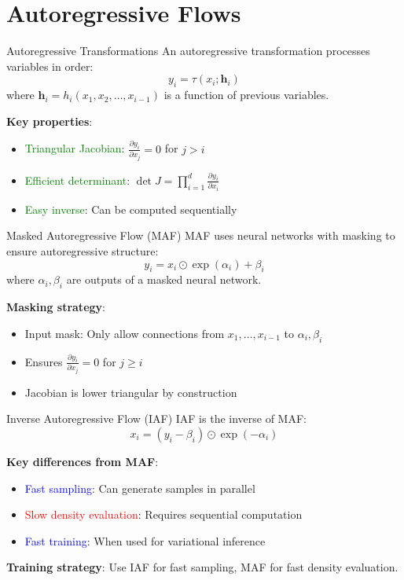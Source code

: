 \documentclass[aspectratio=169]{beamer}
\begin{document}
\section{Autoregressive Flows}

\begin{frame}{Autoregressive Transformations}
An autoregressive transformation processes variables in order:
\begin{equation}
    y_i = \tau(x_i; \mathbf{h}_i)
\end{equation}
where $\mathbf{h}_i = h_i(x_1, x_2, \ldots, x_{i-1})$ is a function of previous variables.

\textbf{Key properties}:
\begin{itemize}
    \item \textcolor{green}{Triangular Jacobian}: $\frac{\partial y_i}{\partial x_j} = 0$ for $j > i$
    \item \textcolor{green}{Efficient determinant}: $\det J = \prod_{i=1}^d \frac{\partial y_i}{\partial x_i}$
    \item \textcolor{green}{Easy inverse}: Can be computed sequentially
\end{itemize}
\end{frame}

\begin{frame}{Masked Autoregressive Flow (MAF)}
MAF uses neural networks with masking to ensure autoregressive structure:
\begin{equation}
    y_i = x_i \odot \exp(\alpha_i) + \beta_i
\end{equation}
where $\alpha_i, \beta_i$ are outputs of a masked neural network.

\textbf{Masking strategy}:
\begin{itemize}
    \item Input mask: Only allow connections from $x_1, \ldots, x_{i-1}$ to $\alpha_i, \beta_i$
    \item Ensures $\frac{\partial y_i}{\partial x_j} = 0$ for $j \geq i$
    \item Jacobian is lower triangular by construction
\end{itemize}
\end{frame}


\begin{frame}{Inverse Autoregressive Flow (IAF)}
IAF is the inverse of MAF:
\begin{equation}
    x_i = (y_i - \beta_i) \odot \exp(-\alpha_i)
\end{equation}

\textbf{Key differences from MAF}:
\begin{itemize}
    \item \textcolor{blue}{Fast sampling}: Can generate samples in parallel
    \item \textcolor{red}{Slow density evaluation}: Requires sequential computation
    \item \textcolor{blue}{Fast training}: When used for variational inference
\end{itemize}

\textbf{Training strategy}: Use IAF for fast sampling, MAF for fast density evaluation.
\end{frame}
\end{document}
